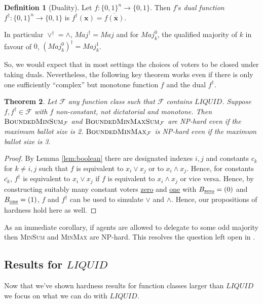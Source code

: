 \documentclass[11pt,a4paper, titlepage]{article}
\newtheorem{theorem}{Theorem}
\theoremstyle{definition}
\newtheorem{definition}[theorem]{Definition}
\let\vec\mathbf
\newcommand{\BMM}{\textsc{BoundedMinMax}}
\newcommand{\BMS}{\textsc{BoundedMinSum}}
\newcommand{\BMMS}{\textsc{BoundedMinMaxSum}}
\newcommand{\Maj}{\mathit{Maj}}
\newcommand{\LIQUID}{\mathit{LIQUID}}
\begin{document}
\begin{definition}[Duality]
    Let $f \colon \{0, 1\}^n \longrightarrow \{0, 1\}$. Then $f$'s \emph{dual function} $f^\dagger \colon \{0, 1\}^n \longrightarrow \{0, 1\}$ is $f^\dagger(\vec{x}) = \overline{f(\overline{\vec{x}})}$.
\end{definition}

In particular $\lor^\dagger = \land$, $\Maj^\dagger= \Maj$ and for $\Maj_k^0$, the qualified majority of $k$ in favour of $0$, $(\Maj_k^0)^\dagger = \Maj_k^1$.

So, we would expect that in most settings the choices of voters to be closed under taking duals.
Nevertheless, the following key theorem works even if there is only one sufficiently ``complex'' but monotone function $f$ and the dual $f^\dagger$.

\begin{theorem}
    Let $\mathcal{F}$ any function class such that $\mathcal{F}$ contains $\LIQUID$. Suppose $f, f^\dagger \in \mathcal{F}$ with $f$ non-constant, not dictatorial and monotone.
    Then $\BMS_\mathcal{F}$ and $\BMMS_\mathcal{F}$ are NP-hard even if the maximum ballot size is 2. $\BMM_{\mathcal{F}}$ is NP-hard even if the maximum ballot size is 3.
\end{theorem}

\begin{proof}
    By Lemma \ref{lem:boolean} there are designated indexes $i, j$ and constants $c_k$ for $k \neq i, j$ such that $f$ is equivalent to $x_i \lor x_j$ or to $x_i \land x_j$.
    Hence, for constants $\overline{c_k}$, $f^\dagger$ is equivalent to $x_i \lor x_j$ if $f$ is equivalent to $x_i \land x_j$ or vice versa.
    Hence, by constructing suitably many constant voters \underline{zero} and \underline{one} with $B_{\text{\underline{zero}}} = (0)$ and $B_{\text{\underline{one}}} = (1)$, $f$ and $f^\dagger$ can be used to simulate $\lor$ and $\land$.
    Hence, our propositions of hardness hold here as well.
\end{proof}

As an immediate corollary, if agents are allowed to delegate to some odd majority then \textsc{MinSum} and \textsc{MinMax} are NP-hard.
This resolves the question left open in \citet{grandi}.

\subsection{Results for $\LIQUID$}

Now that we've shown hardness results for function classes larger than $\LIQUID$ we focus on what we can do with $\LIQUID$.
\end{document}
